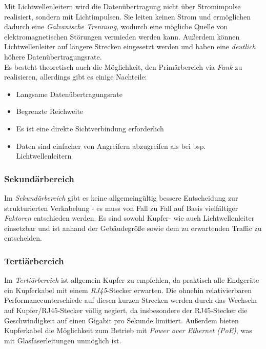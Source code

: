 \documentclass[a4paper, 12pt]{report}
\begin{document}
\begin{multicols}{2}
Mit Lichtwellenleitern wird die Datenübertragung nicht über Stromimpulse
realisiert, sondern mit Lichtimpulsen. Sie leiten keinen Strom und ermöglichen
dadurch eine \emph{Galvanische Trennung}, wodurch eine mögliche Quelle von
elektromagnetischen Störungen vermieden werden kann. Außerdem können
Lichtwellenleiter auf längere Strecken eingesetzt werden und haben eine
\emph{deutlich} höhere Datenübertragungsrate. \\

Es besteht theoretisch auch die Möglichkeit, den Primärbereich via \emph{Funk}
zu realisieren, allerdings gibt es einige Nachteile:

\begin{itemize}
    \item Langsame Datenübertragungsrate
    \item Begrenzte Reichweite
    \item Es ist eine direkte Sichtverbindung erforderlich
    \item Daten sind einfacher von Angreifern abzugreifen als bei bsp.
	Lichtwellenleitern
\end{itemize}

\subsubsection{Sekundärbereich}

Im \emph{Sekundärbereich} gibt es keine allgemeingültig bessere Entscheidung
zur strukturierten Verkabelung - es muss von Fall zu Fall auf Basis vielfältiger
\emph{Faktoren} entschieden werden. Es sind sowohl Kupfer- wie auch
Lichtwellenleiter einsetzbar und ist anhand der Gebäudegröße sowie dem zu
erwartenden Traffic zu entscheiden.

\subsubsection{Tertiärbereich}

Im \emph{Tertiärbereich} ist allgemein Kupfer zu empfehlen, da praktisch alle
Endgeräte ein Kupferkabel mit einem \emph{RJ45}-Stecker erwarten. Die ohnehin
relativierbaren Performanceunterschiede auf diesen kurzen Strecken werden
durch das Wechseln auf Kupfer/RJ45-Stecker völlig negiert, da insbesondere der
RJ45-Stecker die Geschwindigkeit auf einen Gigabit pro Sekunde limitiert.
Außerdem bieten Kupferkabel die Möglichkeit zum Betrieb mit
\emph{Power over Ethernet (PoE)}, was mit Glasfaserleitungen unmöglich ist.


\end{multicols}
\end{document}
